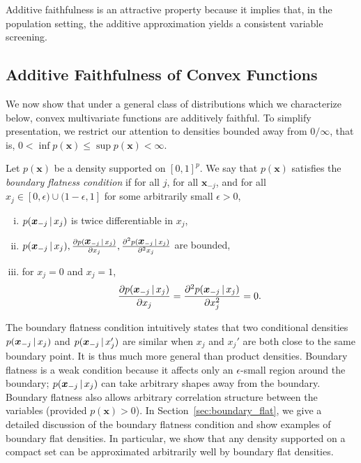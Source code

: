
Additive faithfulness is an attractive property because it implies
that, in the population setting, the additive approximation yields
a consistent variable screening.

\subsection{Additive Faithfulness of Convex Functions}

We now show that under a general class of distributions which we
characterize below, convex multivariate functions are additively
faithful. To simplify presentation, we restrict our attention to densities bounded away from $0/\infty$, that is, $0 < \inf p(\mathbf{x}) \leq \sup p(\mathbf{x}) < \infty$. 

\begin{definition}
\label{defn:boundary-point}
Let $p(\mathbf{x})$ be a density supported on $[0,1]^p$. We say that
$p(\mathbf{x})$ satisfies the \emph{boundary flatness condition} if
for all $j$, for all $\mathbf{x}_{-j}$, and for all $x_j \in [0,
  \epsilon) \cup (1-\epsilon, 1]$ for some arbitrarily small $\epsilon
> 0$, 
\begin{enumerate}[(i)]
\item $p(\mbox{\boldmath $x$}_{-j} {\,|\,} x_j)$ is twice differentiable in
$x_j$,
\item $p(\mbox{\boldmath $x$}_{-j} {\,|\,} x_j), \frac{\partial
  p(\mbox{\boldmath $x$}_{-j} {\,|\,} x_j)}{\partial x_j}, \frac{\partial^2
  p(\mbox{\boldmath $x$}_{-j} {\,|\,} x_j) }{\partial^2 x_j}$ are bounded,
\item for $x_j=0$ and $x_j=1$,
\begin{equation}
\frac{\partial p(\mbox{\boldmath $x$}_{-j} {\,|\,} x_j)}{\partial x_j}  =  
\frac{\partial^2 p(\mbox{\boldmath $x$}_{-j} {\,|\,} x_j)}{\partial x_j^2} = 0.
\end{equation}
\end{enumerate}

\end{definition}

The boundary flatness condition intuitively states that two
conditional densities $p(\mbox{\boldmath $x$}_{-j} {\,|\,} x_j)$ and
$p(\mbox{\boldmath $x$}_{-j} {\,|\,} x_j')$ are similar when $x_j$ and $x_j'$ are
both close to the same boundary point. It is thus much more general
than product densities. Boundary flatness is a weak condition because
it affects only an $\epsilon$-small region around the boundary;
$p(\mbox{\boldmath $x$}_{-j} {\,|\,} x_j)$ can take arbitrary shapes away from
the boundary. Boundary flatness also allows arbitrary correlation
structure between the variables (provided $p(\mathbf{x}) >0$). In
Section~\ref{sec:boundary_flat}, we give a detailed discussion of the
boundary flatness condition and show examples of boundary flat
densities. In particular, we show that any density supported on a
compact set can be approximated arbitrarily well by boundary flat
densities.




